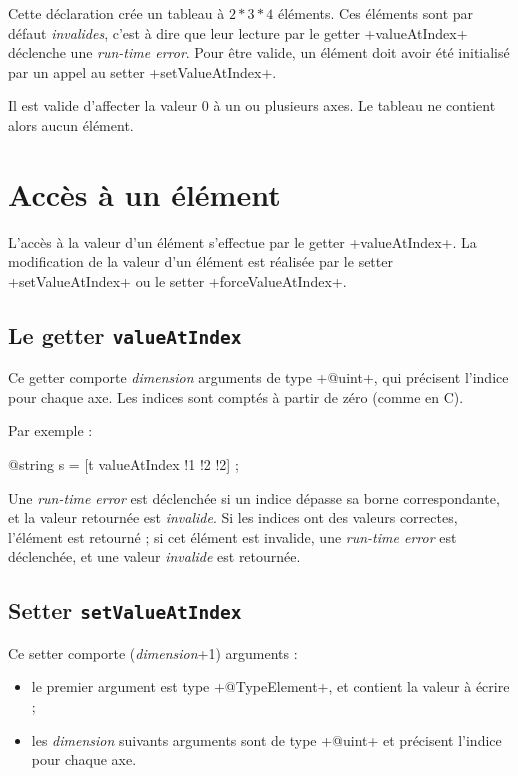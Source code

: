 Cette déclaration crée un tableau à $2*3*4$ éléments. Ces éléments sont par défaut \emph{invalides}, c'est à dire que leur lecture par le getter \ggs+valueAtIndex+ déclenche une \emph{run-time error}. Pour être valide, un élément doit avoir été initialisé par un appel au setter \ggs+setValueAtIndex+.

Il est valide d'affecter la valeur $0$ à un ou plusieurs axes. Le tableau ne contient alors aucun élément.


\section{Accès à un élément}

L'accès à la valeur d'un élément s'effectue par le getter \ggs+valueAtIndex+. La modification de la valeur d'un élément est réalisée par le setter \ggs+setValueAtIndex+ ou le setter \ggs+forceValueAtIndex+.

\subsection{Le getter \texttt{valueAtIndex}}

Ce getter comporte \emph{dimension} arguments de type \ggs+@uint+, qui précisent l'indice pour chaque axe. Les indices sont comptés à partir de zéro (comme en C).

Par exemple :
\begin{galgascode}
  @string s = [t valueAtIndex !1 !2 !2] ;
\end{galgascode}


Une \emph{run-time error} est déclenchée si un indice dépasse sa borne correspondante, et la valeur retournée est \emph{invalide}. Si les indices ont des valeurs correctes, l'élément est retourné ; si cet élément est invalide, une \emph{run-time error} est déclenchée, et une valeur \emph{invalide} est retournée.






\subsection{Setter \texttt{setValueAtIndex}}

Ce setter comporte (\emph{dimension}+1) arguments :
\begin{itemize}
  \item le premier argument est type \ggs+@TypeElement+, et contient la valeur à écrire ;
  \item les \emph{dimension} suivants arguments sont de type \ggs+@uint+ et précisent l'indice pour chaque axe.
\end{itemize} 
  
